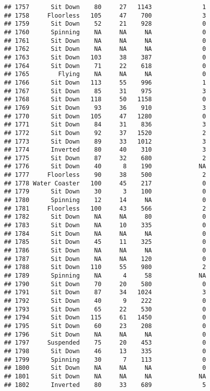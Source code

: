 \documentclass[
]{article}
\begin{document}
\begin{verbatim}
## 1757      Sit Down    80     27   1143              1
## 1758     Floorless   105     47    700              3
## 1759      Sit Down    52     21    928              0
## 1760      Spinning    NA     NA     NA              0
## 1761      Sit Down    NA     NA     NA              0
## 1762      Sit Down    NA     NA     NA              0
## 1763      Sit Down   103     38    387              0
## 1764      Sit Down    71     22    618              0
## 1765        Flying    NA     NA     NA              0
## 1766      Sit Down   113     55    996              1
## 1767      Sit Down    85     31    975              3
## 1768      Sit Down   118     50   1158              0
## 1769      Sit Down    93     36    910              3
## 1770      Sit Down   105     47   1280              0
## 1771      Sit Down    84     31    836              3
## 1772      Sit Down    92     37   1520              2
## 1773      Sit Down    89     33   1012              3
## 1774      Inverted    80     40    310              3
## 1775      Sit Down    87     32    680              2
## 1776      Sit Down    40      8    190             NA
## 1777     Floorless    90     38    500              2
## 1778 Water Coaster   100     45    217              0
## 1779      Sit Down    30      3    100              0
## 1780      Spinning    12     14     NA              0
## 1781     Floorless   100     43    566              2
## 1782      Sit Down    NA     NA     80              0
## 1783      Sit Down    NA     10    335              0
## 1784      Sit Down    NA     NA     NA              0
## 1785      Sit Down    45     11    325              0
## 1786      Sit Down    NA     NA     NA              0
## 1787      Sit Down    NA     NA    120              0
## 1788      Sit Down   110     55    980              2
## 1789      Spinning    NA      4     58             NA
## 1790      Sit Down    70     20    580              0
## 1791      Sit Down    87     34   1024              3
## 1792      Sit Down    40      9    222              0
## 1793      Sit Down    65     22    530              0
## 1794      Sit Down   115     61   1450              0
## 1795      Sit Down    60     23    208              0
## 1796      Sit Down    NA     NA     NA              0
## 1797     Suspended    75     20    453              0
## 1798      Sit Down    46     13    335              0
## 1799      Spinning    30      7    113              0
## 1800      Sit Down    NA     NA     NA              0
## 1801      Sit Down    NA     NA     NA             NA
## 1802      Inverted    80     33    689              5

\end{verbatim}
\end{document}

